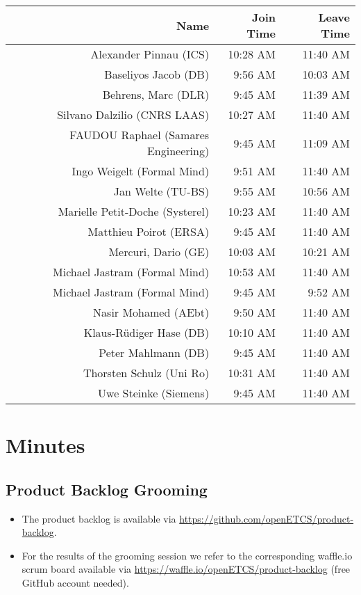\documentclass[a4paper, 11pt]{article}
\begin{document}
\begin{table}[htbp]
    \begin{tabular}{rrr}
    \toprule
    \textbf{Name} & \textbf{Join Time} & \textbf{Leave Time} \\
    \midrule
     Alexander Pinnau (ICS) & 10:28 AM & 11:40 AM \\
     Baseliyos Jacob (DB) & 9:56 AM & 10:03 AM \\
     Behrens, Marc (DLR)& 9:45 AM & 11:39 AM \\
     Silvano Dalzilio (CNRS LAAS)& 10:27 AM & 11:40 AM \\
     FAUDOU Raphael (Samares Engineering)& 9:45 AM & 11:09 AM \\
     Ingo Weigelt (Formal Mind)& 9:51 AM & 11:40 AM \\
     Jan Welte (TU-BS) & 9:55 AM & 10:56 AM \\
     Marielle Petit-Doche (Systerel)& 10:23 AM & 11:40 AM \\
     Matthieu Poirot (ERSA) & 9:45 AM & 11:40 AM \\
     Mercuri, Dario (GE) & 10:03 AM & 10:21 AM \\
     Michael Jastram (Formal Mind)& 10:53 AM & 11:40 AM \\
     Michael Jastram (Formal Mind)& 9:45 AM & 9:52 AM \\
     Nasir Mohamed (AEbt) & 9:50 AM & 11:40 AM \\
     Klaus-R\"udiger Hase (DB)& 10:10 AM & 11:40 AM \\
     Peter Mahlmann (DB) & 9:45 AM & 11:40 AM \\
     Thorsten Schulz (Uni Ro) & 10:31 AM & 11:40 AM \\
     Uwe Steinke (Siemens) & 9:45 AM & 11:40 AM \\
     \bottomrule
    \end{tabular}%
  \label{tab:addlabel}%
\end{table}%




\section{Minutes}

\subsection{Product Backlog Grooming}
\begin{itemize}
\item The product backlog is available via 
\url{https://github.com/openETCS/product-backlog}. 
\item For the results of the grooming session we refer to the corresponding waffle.io scrum board available via \url{https://waffle.io/openETCS/product-backlog} (free GitHub account needed).
\end{itemize}
\end{document}
